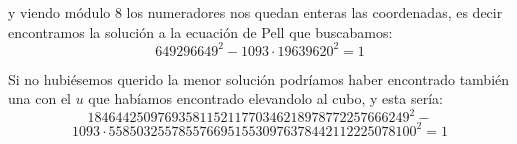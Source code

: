 \documentclass[12pt]{amsart}
\newcommand{\QQ}{\mathbb{Q}}
\newcommand{\ZZ}{\mathbb{Z}}
\newcommand{\OO}{\mathcal{O}}
\newcommand{\lc}{\left<}
\newcommand{\rc}{\right>}
\newcommand{\lco}{\left[}
\newcommand{\rco}{\right]}
\theoremstyle{plain}
\begin{document}
y viendo módulo 8 los numeradores nos quedan enteras las 
coordenadas, es decir encontramos la solución a la ecuación 
de Pell que buscabamos:
$$649296649^2 - 1093\cdot19639620^2 = 1$$

Si no hubiésemos querido la menor solución podríamos haber 
encontrado también una con el $u$ que habíamos encontrado
elevandolo al cubo, y esta sería:
$$1846442509769358115211770346218978772257666249^2 - $$
$$1093\cdot 55850325578557669515530976378442112225078100^2 = 1$$











\end{document}
